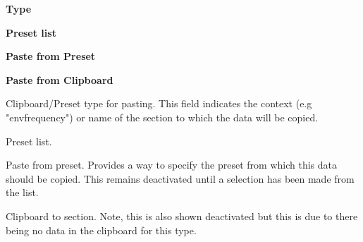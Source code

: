    \begin{enumber}
      \item \textbf{Type}
      \item \textbf{Preset list}
      \item \textbf{Paste from Preset}
      \item \textbf{Paste from Clipboard}
   \end{enumber}

   \setcounter{ItemCounter}{0}      %

   Clipboard/Preset type for pasting.
   This field indicates the context (e.g "envfrequency") or name of the
   section to which the data will be copied.

   Preset list.

   Paste from preset.
   Provides a way to specify the preset from which this data should be copied.
   This remains deactivated until a selection has been made from the list.

   Clipboard to section. Note, this is also shown deactivated but this is due to there
   being no data in the clipboard for this type.

